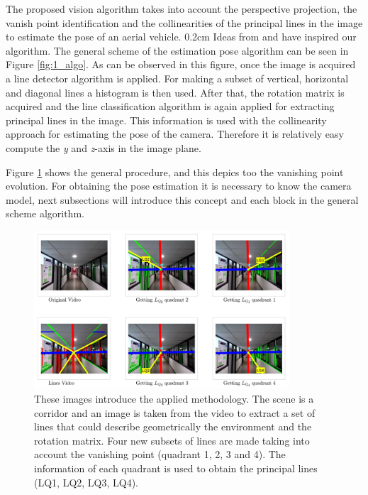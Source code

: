  The proposed vision algorithm takes into account the perspective projection, the vanish point identification and the collinearities of the principal lines in the image to estimate the pose of an aerial vehicle. 0.2cm Ideas from \cite{Akinlar2011, boulanger:inria-00461526} and \cite{Lee2009} have inspired our algorithm.  The general scheme of the estimation pose algorithm can be seen in Figure \ref{fig:1_algo}. As can be observed in this figure, once the image is acquired a line
detector algorithm is applied. For making a subset of vertical, horizontal and diagonal lines a histogram is then used. After that, the rotation matrix is acquired and the line classification algorithm is again applied for extracting principal lines in the image. This information is used with the collinearity approach for estimating the pose of the camera. Therefore it is relatively easy compute the \textit{y} and \textit{z}-axis in the image plane.

Figure \ref{fig:VisionAlgoritm} shows the general procedure, and  this  depics too the vanishing point evolution. For obtaining the pose estimation it is necessary to know the camera model, next subsections will introduce this concept and each block in the general scheme algorithm.

\begin{figure}[h!]
\centering
\includegraphics[width=0.85\textwidth]{Chapter03/Images/Algoritme_m.png}
\caption{These images introduce the applied methodology. The scene is a corridor and an image is taken from the video to extract a set of lines that could describe geometrically the environment and the rotation matrix. Four new subsets of lines are made taking into account the vanishing point (quadrant 1, 2, 3 and 4). The information of each quadrant is used to obtain the principal lines (LQ1, LQ2, LQ3, LQ4). }
\label{fig:VisionAlgoritm}
\end{figure}


